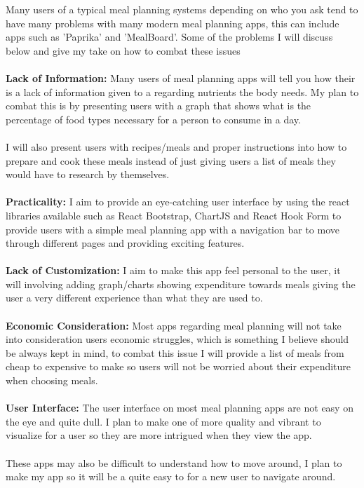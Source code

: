 Many users of a typical meal planning systems depending on who you ask tend to have many problems with many modern meal planning apps, this can include apps such as 'Paprika' and 'MealBoard'. Some of the problems I will discuss below and give my take on how to combat these issues \\ \\
\textbf{Lack of Information: }Many users of meal planning apps will tell you how their is a lack of information given to a regarding nutrients the body needs.
My plan to combat this is by presenting users with a graph that shows what is the percentage of food types necessary for a person to consume in a day. \\ \\
I will also present users with recipes/meals and proper instructions into how to prepare and cook these meals instead of just giving users a list of meals they would have to research by themselves.
\\ \\
\textbf{Practicality: }I aim to provide an eye-catching user interface by using the react libraries available such as React Bootstrap, ChartJS and React Hook Form to provide users with a simple meal planning app with a navigation bar to move through different pages and providing exciting features.\\ \\
\textbf{Lack of Customization: }I aim to make this app feel personal to the user, it will involving adding graph/charts showing expenditure towards meals giving the user a very different experience than what they are used to.\\ \\
\textbf{Economic Consideration: }Most apps regarding meal planning will not take into consideration users economic struggles, which is something I believe should be always kept in mind, to combat this issue I will provide a list of meals from cheap to expensive to make so users will not be worried about their expenditure when choosing meals. 
\\ \\
\textbf{User Interface: }The user interface on most meal planning apps are not easy on the eye and quite dull. I plan to make one of more quality and vibrant to visualize for a user so they are more intrigued when they view the app. \\ \\
These apps may also be difficult to understand how to move around, I plan to make my app so it will be a quite easy to for a new user to navigate around.

